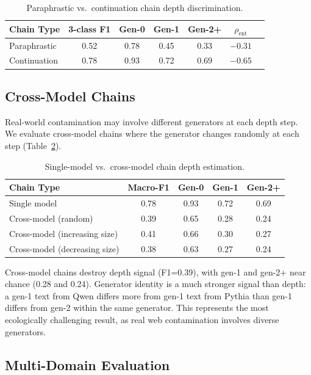 \documentclass[11pt]{article}
\begin{document}
\begin{table}[h]
\centering
\caption{Paraphrastic vs.\ continuation chain depth discrimination.}
\label{tab:para}
\begin{tabular}{lcccccc}
\toprule
Chain Type & 3-class F1 & Gen-0 & Gen-1 & Gen-2+ & $\rho_{\text{ent}}$ \\
\midrule
Paraphrastic & 0.52 & 0.78 & 0.45 & 0.33 & $-0.31$ \\
Continuation & 0.78 & 0.93 & 0.72 & 0.69 & $-0.65$ \\
\bottomrule
\end{tabular}
\end{table}

\subsection{Cross-Model Chains}
\label{sec:cross_model}

Real-world contamination may involve different generators at each depth step.
We evaluate cross-model chains where the generator changes randomly at each step (Table~\ref{tab:crossmodel}).

\begin{table}[h]
\centering
\caption{Single-model vs.\ cross-model chain depth estimation.}
\label{tab:crossmodel}
\begin{tabular}{lcccc}
\toprule
Chain Type & Macro-F1 & Gen-0 & Gen-1 & Gen-2+ \\
\midrule
Single model & 0.78 & 0.93 & 0.72 & 0.69 \\
Cross-model (random) & 0.39 & 0.65 & 0.28 & 0.24 \\
Cross-model (increasing size) & 0.41 & 0.66 & 0.30 & 0.27 \\
Cross-model (decreasing size) & 0.38 & 0.63 & 0.27 & 0.24 \\
\bottomrule
\end{tabular}
\end{table}

Cross-model chains destroy depth signal (F1=0.39), with gen-1 and gen-2+ near chance (0.28 and 0.24).
Generator identity is a much stronger signal than depth: a gen-1 text from Qwen differs more from gen-1 text from Pythia than gen-1 differs from gen-2 within the same generator.
This represents the most ecologically challenging result, as real web contamination involves diverse generators.

\subsection{Multi-Domain Evaluation}
\label{sec:domain}
\end{document}
